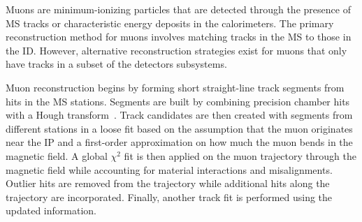 Muons are minimum-ionizing particles that are detected through the presence of MS tracks or characteristic energy deposits in the calorimeters. The primary reconstruction method for muons involves matching tracks in the MS to those in the ID\@. However, alternative reconstruction strategies exist for muons that only have tracks in a subset of the detectors subsystems.

Muon reconstruction begins by forming short straight-line track segments from hits in the MS stations. Segments are built by combining precision chamber hits with a Hough transform~\cite{ILLINGWORTH198887}. Track candidates are then created with segments from different stations in a loose fit based on the assumption that the muon originates near the IP and a first-order approximation on how much the muon bends in the magnetic field. A global $\chi^{2}$ fit is then applied on the muon trajectory through the magnetic field while accounting for material interactions and misalignments. Outlier hits are removed from the trajectory while additional hits along the trajectory are incorporated. Finally, another track fit is performed using the updated information.

